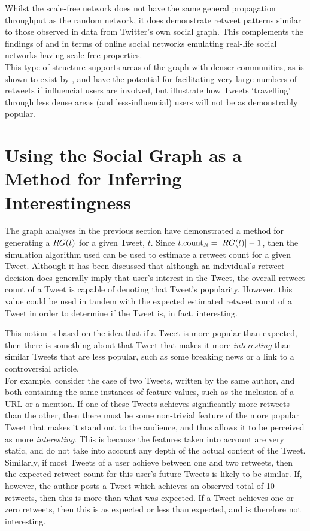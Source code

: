 Whilst the scale-free network does not have the same general propagation throughput as the random network, it does demonstrate retweet patterns similar to those observed in data from Twitter's own social graph. This complements the findings of \cite{mislove07} and \cite{hein06} in terms of online social networks emulating real-life social networks having scale-free properties.\\
This type of structure supports areas of the graph with denser communities, as is shown to exist by \cite{java07}, and have the potential for facilitating very large numbers of retweets if influencial users are involved, but illustrate how Tweets `travelling' through less dense areas (and less-influencial) users will not be as demonstrably popular.



\section{Using the Social Graph as a Method for Inferring Interestingness}
The graph analyses in the previous section have demonstrated a method for generating a $RG(t)$ for a given Tweet, $t$. Since $t.\textrm{count}_R = |RG(t)| - 1$, then the simulation algorithm used can be used to estimate a retweet count for a given Tweet. Although it has been discussed that although an individual's retweet decision does generally imply that user's interest in the Tweet, the overall retweet count of a Tweet is capable of denoting that Tweet's popularity. However, this value could be used in tandem with the expected estimated retweet count of a Tweet in order to determine if the Tweet is, in fact, interesting.

This notion is based on the idea that if a Tweet is more popular than expected, then there is something about that Tweet that makes it more \textit{interesting} than similar Tweets that are less popular, such as some breaking news or a link to a controversial article.\\
For example, consider the case of two Tweets, written by the same author, and both containing the same instances of feature values, such as the inclusion of a URL or a mention. If one of these Tweets achieves significantly more retweets than the other, then there must be some non-trivial feature of the more popular Tweet that makes it stand out to the audience, and thus allows it to be perceived as more \textit{interesting}. This is because the features taken into account are very static, and do not take into account any depth of the actual content of the Tweet.\\
Similarly, if most Tweets of a user achieve between one and two retweets, then the expected retweet count for this user's future Tweets is likely to be similar. If, however, the author posts a Tweet which achieves an observed total of 10 retweets, then this is more than what was expected. If a Tweet achieves one or zero retweets, then this is as expected or less than expected, and is therefore not interesting.

